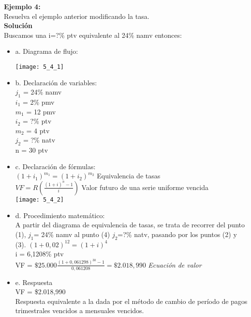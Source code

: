 \textbf{Ejemplo 4:}\\
Resuelva el ejemplo anterior modificando la tasa.\\

\textbf{Solución}\\

Buscamos una i=?\% ptv equivalente al 24\% namv entonces:\\

\begin{itemize}
	\item a. Diagrama de flujo:\\
	\begin{center}
		\texttt{[image: 5\_4\_1]}\\
	\end{center}
	
	
	\item b. Declaración de variables:\\
	$j_{1}$ = 24\% namv\\
	$i_{1}$ = 2\% pmv\\
	$m_{1}$ = 12 pmv \\
	$i_{2}$ = ?\% ptv\\
	$m_{2}$ = 4 ptv\\
	$j_{2}$ = ?\% natv\\
	n = 30 ptv\\
	 
	\item c. Declaración de fórmulas:\\
	
	$(1+i_{1})^{m_{1}} = (1+i_{2})^{m_{2}}$ Equivalencia de tasas\\
	$VF = R(\frac{(1+i)^n-1}{i})$ Valor futuro de una serie uniforme vencida\\
	
	
	\texttt{[image: 5\_4\_2]}

	
	\item d. Procedimiento matemático:\\
	A partir del diagrama de equivalencia de tasas, se trata de recorrer del punto (1), $j_{1}$= 24\% namv al punto (4) $j_{2}$=?\% natv, pasando por los puntos (2) y (3).
	$(1+0,02)^{12} = (1+i)^4$\\
	
	i = 6,1208\% ptv\\
	
	VF = $\$25.000\frac{(1+0,061298)^{30}-1}{0,061208} = \$2.018,990$ \hspace{35 pt} \textit{Ecuación de valor}\\
	\item e. Respuesta\\
	VF = \$2.018,990\\
	Respuesta equivalente a la dada por el método de cambio de período de pagos trimestrales vencidos a mensuales vencidos.
\end{itemize}

